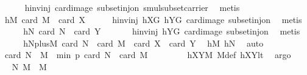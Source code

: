 \begin{isabellebody}
\ \ \ \ \isamarkupfalse%
\ hinvinj\ card{\isacharunderscore}{\kern0pt}image\ subset{\isacharunderscore}{\kern0pt}inj{\isacharunderscore}{\kern0pt}on\ smul{\isacharunderscore}{\kern0pt}subset{\isacharunderscore}{\kern0pt}carrier\ \isamarkupfalse%
\ metis\isanewline
\ \ \isamarkupfalse%
\ \isamarkupfalse%
\ hM{\isacharcolon}{\kern0pt}\ {\isachardoublequoteopen}card\ {\isacharquery}{\kern0pt}M\ {\isacharequal}{\kern0pt}\ card\ X{\isachardoublequoteclose}\isanewline
\ \ \ \ \isamarkupfalse%
\ hinvinj\ hXG\ hYG\ card{\isacharunderscore}{\kern0pt}image\ subset{\isacharunderscore}{\kern0pt}inj{\isacharunderscore}{\kern0pt}on\ \isamarkupfalse%
\ metis\isanewline
\ \ \isamarkupfalse%
\ \isamarkupfalse%
\ hN{\isacharcolon}{\kern0pt}\ {\isachardoublequoteopen}card\ {\isacharquery}{\kern0pt}N\ {\isacharequal}{\kern0pt}\ card\ Y{\isachardoublequoteclose}\ \isanewline
\ \ \ \ \isamarkupfalse%
\ hinvinj\ hYG\ card{\isacharunderscore}{\kern0pt}image\ subset{\isacharunderscore}{\kern0pt}inj{\isacharunderscore}{\kern0pt}on\ \isamarkupfalse%
\ metis\isanewline
\ \ \isamarkupfalse%
\ \isamarkupfalse%
\ hNplusM{\isacharcolon}{\kern0pt}\ {\isachardoublequoteopen}card\ {\isacharquery}{\kern0pt}N\ {\isacharplus}{\kern0pt}\ card\ {\isacharquery}{\kern0pt}M\ {\isacharequal}{\kern0pt}\ card\ X\ {\isacharplus}{\kern0pt}\ card\ Y{\isachardoublequoteclose}\ \isamarkupfalse%
\ hM\ hN\ \isamarkupfalse%
\ auto\isanewline
\ \ \isamarkupfalse%
\ \isamarkupfalse%
\ {\isachardoublequoteopen}card\ {\isacharparenleft}{\kern0pt}{\isacharquery}{\kern0pt}N\ {\isasymcdots}\ {\isacharquery}{\kern0pt}M{\isacharparenright}{\kern0pt}\ {\isacharless}{\kern0pt}\ min\ p\ {\isacharparenleft}{\kern0pt}card\ {\isacharquery}{\kern0pt}N\ {\isacharplus}{\kern0pt}\ card\ {\isacharquery}{\kern0pt}M\ {\isacharminus}{\kern0pt}\ {}{\isacharparenright}{\kern0pt}{\isachardoublequoteclose}\ \isanewline
\ \ \ \ \isamarkupfalse%
\ hXYM\ M{\isacharunderscore}{\kern0pt}def\ hXYlt\ \isamarkupfalse%
\ argo\isanewline
\ \ \isamarkupfalse%
\ \isamarkupfalse%
\ {\isachardoublequoteopen}{\isacharparenleft}{\kern0pt}{\isacharquery}{\kern0pt}N{\isacharcomma}{\kern0pt}\ {\isacharquery}{\kern0pt}M{\isacharparenright}{\kern0pt}\ {\isasymin}\ M{\isachardoublequoteclose}\ \isamarkupfalse%

\end{isabellebody}
